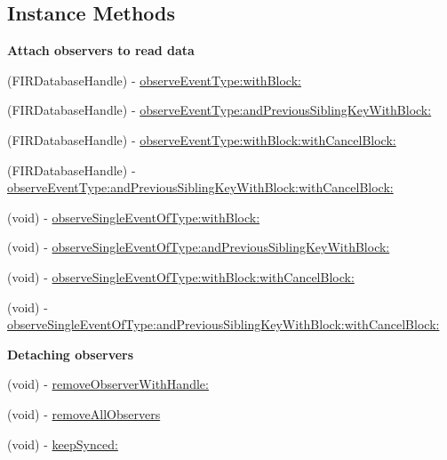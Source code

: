\subsection*{Instance Methods}
\begin{Indent}{\bf Attach observers to read data}\par
\begin{DoxyCompactItemize}
\item 
(F\+I\+R\+Database\+Handle) -\/ \hyperlink{interface_f_i_r_database_query_a6862c953406b45914cc0f1725aed26f9}{observe\+Event\+Type\+:with\+Block\+:}
\item 
(F\+I\+R\+Database\+Handle) -\/ \hyperlink{interface_f_i_r_database_query_a206825e56f8ab6803b1764feec51cd45}{observe\+Event\+Type\+:and\+Previous\+Sibling\+Key\+With\+Block\+:}
\item 
(F\+I\+R\+Database\+Handle) -\/ \hyperlink{interface_f_i_r_database_query_a939d866e0e40c8d75135f35ac25487a3}{observe\+Event\+Type\+:with\+Block\+:with\+Cancel\+Block\+:}
\item 
(F\+I\+R\+Database\+Handle) -\/ \hyperlink{interface_f_i_r_database_query_a37b21064ed9c40c186725ea77ca6194e}{observe\+Event\+Type\+:and\+Previous\+Sibling\+Key\+With\+Block\+:with\+Cancel\+Block\+:}
\item 
(void) -\/ \hyperlink{interface_f_i_r_database_query_a403e05f65d5a4d597392e232247f9d6a}{observe\+Single\+Event\+Of\+Type\+:with\+Block\+:}
\item 
(void) -\/ \hyperlink{interface_f_i_r_database_query_ab874dc0b4bc703f245d69f88823f1912}{observe\+Single\+Event\+Of\+Type\+:and\+Previous\+Sibling\+Key\+With\+Block\+:}
\item 
(void) -\/ \hyperlink{interface_f_i_r_database_query_a8d2baf564e8b20350aeccc3ad9b600cd}{observe\+Single\+Event\+Of\+Type\+:with\+Block\+:with\+Cancel\+Block\+:}
\item 
(void) -\/ \hyperlink{interface_f_i_r_database_query_aaf798cab75512cc021749f13abb5d467}{observe\+Single\+Event\+Of\+Type\+:and\+Previous\+Sibling\+Key\+With\+Block\+:with\+Cancel\+Block\+:}
\end{DoxyCompactItemize}
\end{Indent}
\begin{Indent}{\bf Detaching observers}\par
\begin{DoxyCompactItemize}
\item 
(void) -\/ \hyperlink{interface_f_i_r_database_query_a1ddc91b4b35613bd5fe9f361fce0e4a3}{remove\+Observer\+With\+Handle\+:}
\item 
(void) -\/ \hyperlink{interface_f_i_r_database_query_a650d750b8044b5e74162c35ea4896b6e}{remove\+All\+Observers}
\item 
(void) -\/ \hyperlink{interface_f_i_r_database_query_a80b1f52d52caca276a2b1da77472dbad}{keep\+Synced\+:}
\end{DoxyCompactItemize}
\end{Indent}
